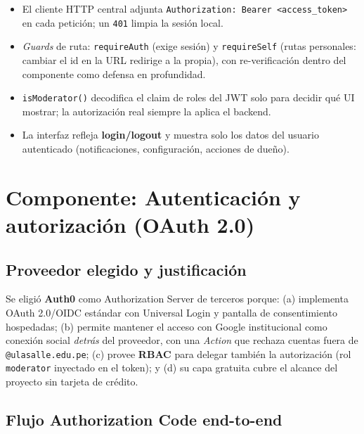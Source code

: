 \documentclass{article}
\begin{document}
\begin{itemize}[itemsep=2pt]
    \item El cliente HTTP central adjunta \texttt{Authorization: Bearer
    <access\_token>} en cada petición; un \texttt{401} limpia la sesión local.
    \item \textit{Guards} de ruta: \texttt{requireAuth} (exige sesión) y
    \texttt{requireSelf} (rutas personales: cambiar el id en la URL redirige a
    la propia), con re-verificación dentro del componente como defensa en
    profundidad.
    \item \texttt{isModerator()} decodifica el claim de roles del JWT solo
    para decidir qué UI mostrar; la autorización real siempre la aplica el
    backend.
    \item La interfaz refleja \textbf{login/logout} y muestra solo los datos
    del usuario autenticado (notificaciones, configuración, acciones de dueño).
\end{itemize}

\section{Componente: Autenticación y autorización (OAuth 2.0)}

\subsection{Proveedor elegido y justificación}

Se eligió \textbf{Auth0} como Authorization Server de terceros porque: (a)
implementa OAuth 2.0/OIDC estándar con Universal Login y pantalla de
consentimiento hospedadas; (b) permite mantener el acceso con Google
institucional como conexión social \textit{detrás} del proveedor, con una
\textit{Action} que rechaza cuentas fuera de \texttt{@ulasalle.edu.pe}; (c)
provee \textbf{RBAC} para delegar también la autorización (rol
\texttt{moderator} inyectado en el token); y (d) su capa gratuita cubre el
alcance del proyecto sin tarjeta de crédito.

\subsection{Flujo Authorization Code end-to-end}
\end{document}
